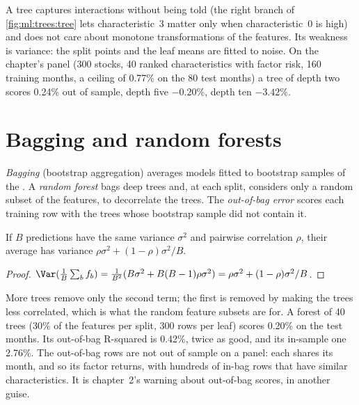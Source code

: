 A tree captures interactions without being told (the right branch of \cref{fig:ml:trees:tree} lets characteristic~3
matter only when characteristic~0 is high) and does not care about monotone transformations of the features. Its
weakness is variance: the split points and the leaf means are fitted to noise. On the chapter's panel (300 stocks, 40
ranked characteristics with factor risk, 160 training months, a ceiling of 0.77\% on the 80 test months) a tree of
depth two scores 0.24\% out of sample, depth five $-0.20\%$, depth ten $-3.42\%$.

\section{Bagging and random forests}

\begin{definition}\label{def:ml:trees-and-boosting:bagging}
\emph{Bagging} (bootstrap aggregation) averages models fitted to bootstrap samples of the .
A \emph{random forest} bags deep trees and, at each split, considers only a random subset of the
features, to decorrelate the trees. The \emph{out-of-bag error} scores each training row with
the trees whose bootstrap sample did not contain it.
\end{definition}

\begin{proposition}\label{prop:ml:trees:bagging}
If $B$ predictions have the same variance $\sigma^2$ and pairwise correlation $\rho$, their average has variance
$\rho\sigma^2 + (1 - \rho)\sigma^2/B$.
\end{proposition}

\begin{proof}
$\Var(\frac1B\sum_bf_b) = \frac1{B^2}(B\sigma^2 + B(B-1)\rho\sigma^2) = \rho\sigma^2 + (1-\rho)\sigma^2/B$.
\end{proof}

More trees remove only the second term; the first is removed by making the trees less correlated, which is what the
random feature subsets are for. A forest of 40 trees (30\% of the features per split, 300 rows per leaf) scores 0.20\%
on the test months. Its out-of-bag R-squared is 0.42\%, twice as good, and its in-sample one 2.76\%. The out-of-bag
rows are not out of sample on a panel: each shares its month, and so its factor returns, with hundreds of in-bag rows
that have similar characteristics. It is chapter~2's warning about out-of-bag scores, in another guise.

